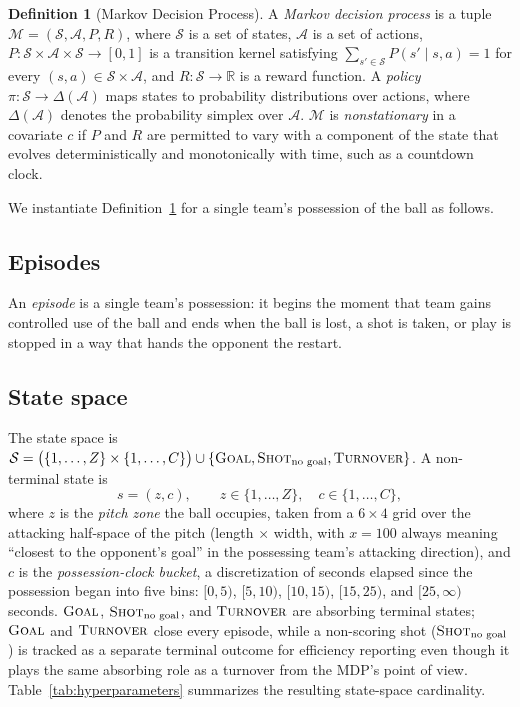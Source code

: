 \documentclass[11pt]{article}
\theoremstyle{plain}
\theoremstyle{definition}
\newtheorem{definition}{Definition}[section]
\theoremstyle{remark}
\newcommand{\R}{\mathbb{R}}
\newcommand{\GOAL}{\textsc{Goal}}
\newcommand{\NOGOAL}{\textsc{Shot}_{\text{no goal}}}
\newcommand{\TURN}{\textsc{Turnover}}
\begin{document}
\begin{definition}[Markov Decision Process]
\label{def:mdp}
A \emph{Markov decision process} is a tuple $\mathcal{M} = (\mathcal{S}, \mathcal{A}, P, R)$, where $\mathcal{S}$ is a set of states, $\mathcal{A}$ is a set of actions, $P:\mathcal{S}\times\mathcal{A}\times\mathcal{S}\to[0,1]$ is a transition kernel satisfying $\sum_{s'\in\mathcal{S}} P(s'\mid s,a) = 1$ for every $(s,a)\in\mathcal{S}\times\mathcal{A}$, and $R:\mathcal{S}\to\R$ is a reward function. A \emph{policy} $\pi:\mathcal{S}\to\Delta(\mathcal{A})$ maps states to probability distributions over actions, where $\Delta(\mathcal{A})$ denotes the probability simplex over $\mathcal{A}$. $\mathcal{M}$ is \emph{nonstationary} in a covariate $c$ if $P$ and $R$ are permitted to vary with a component of the state that evolves deterministically and monotonically with time, such as a countdown clock.
\end{definition}

We instantiate Definition~\ref{def:mdp} for a single team's possession of the ball as follows.

\subsection{Episodes}
An \emph{episode} is a single team's possession: it begins the moment that team gains controlled use of the ball and ends when the ball is lost, a shot is taken, or play is stopped in a way that hands the opponent the restart.

\subsection{State space}
The state space is $\mathcal{S} = \big(\{1,\dots,Z\}\times\{1,\dots,C\}\big) \cup \{\GOAL, \NOGOAL, \TURN\}$. A non-terminal state is
\begin{equation}
s = (z, c), \qquad z \in \{1,\dots,Z\}, \quad c \in \{1,\dots,C\},
\end{equation}
where $z$ is the \emph{pitch zone} the ball occupies, taken from a $6\times 4$ grid over the attacking half-space of the pitch (length $\times$ width, with $x=100$ always meaning ``closest to the opponent's goal'' in the possessing team's attacking direction), and $c$ is the \emph{possession-clock bucket}, a discretization of seconds elapsed since the possession began into five bins: $[0,5)$, $[5,10)$, $[10,15)$, $[15,25)$, and $[25,\infty)$ seconds. $\GOAL$, $\NOGOAL$, and $\TURN$ are absorbing terminal states; $\GOAL$ and $\TURN$ close every episode, while a non-scoring shot ($\NOGOAL$) is tracked as a separate terminal outcome for efficiency reporting even though it plays the same absorbing role as a turnover from the MDP's point of view. Table~\ref{tab:hyperparameters} summarizes the resulting state-space cardinality.
\end{document}
